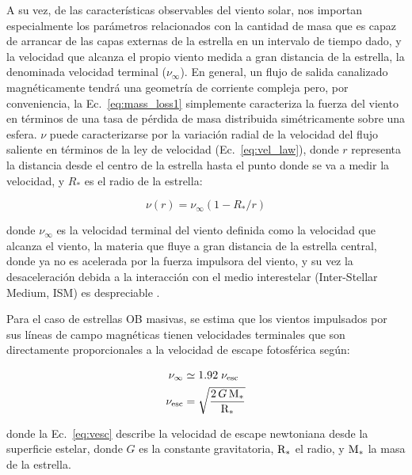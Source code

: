 A su vez, de las características observables del viento solar, nos importan especialmente los parámetros relacionados con la cantidad de masa que es capaz de arrancar de las capas externas de la estrella en un intervalo de tiempo dado, y la velocidad que alcanza el propio viento medida a gran distancia de la estrella, la denominada velocidad terminal ($\nu_\infty$). En general, un flujo de salida canalizado magnéticamente tendrá una geometría de corriente compleja pero, por conveniencia, la Ec.~\ref{eq:mass_loss1} simplemente caracteriza la fuerza del viento en términos de una tasa de pérdida de masa distribuida simétricamente sobre una esfera. $\nu$ puede caracterizarse por la variación radial de la velocidad del flujo saliente en términos de la ley de velocidad (Ec.~\ref{eq:vel_law}), donde $r$ representa la distancia desde el centro de la estrella hasta el punto donde se va a medir la velocidad, y $R_*$ es el radio de la estrella:\par

\begin{equation}
    \nu(r) = \nu_\infty (1-R_*/r) \label{eq:vel_law}
\end{equation}

donde $\nu_\infty$ es la velocidad terminal del viento definida como la velocidad que alcanza el viento, la materia que fluye a gran distancia de la estrella central, donde ya no es acelerada por la fuerza impulsora del viento, y su vez la desaceleración debida a la interacción con el medio interestelar (Inter-Stellar Medium, ISM) es despreciable \citep{Niedzielski2002}.\par

Para el caso de estrellas OB masivas, se estima que los vientos impulsados por sus líneas de campo magnéticas tienen velocidades terminales que son directamente proporcionales a la velocidad de escape fotosférica \citep{Lamers2000} según:\par

\begin{ceqn}
\begin{align}
    \nu_\infty &\simeq 1.92 \;\nu_{\textrm{esc}} \label{eq:vinf}\\
    \nu_{\textrm{esc}} &= \sqrt{\frac{2\,G\,\mathrm{M}_*}{\mathrm{R}_*}} \label{eq:vesc}
\end{align}
\end{ceqn}

donde la Ec.~\ref{eq:vesc} describe la velocidad de escape newtoniana desde la superficie estelar, donde $G$ es la constante gravitatoria, ${\mathrm{R}_*}$ el radio, y ${\mathrm{M}_*}$ la masa de la estrella.

